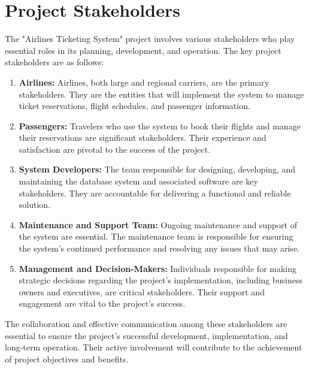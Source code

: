 \section{Project Stakeholders}
The "Airlines Ticketing System" project involves various stakeholders who play essential roles in its planning, development, and operation. The key project stakeholders are as follows:

\begin{enumerate}
    \item \textbf{Airlines:} Airlines, both large and regional carriers, are the primary stakeholders. They are the entities that will implement the system to manage ticket reservations, flight schedules, and passenger information.

    \item \textbf{Passengers:} Travelers who use the system to book their flights and manage their reservations are significant stakeholders. Their experience and satisfaction are pivotal to the success of the project.

    \item \textbf{System Developers:} The team responsible for designing, developing, and maintaining the database system and associated software are key stakeholders. They are accountable for delivering a functional and reliable solution.

    \item \textbf{Maintenance and Support Team:} Ongoing maintenance and support of the system are essential. The maintenance team is responsible for ensuring the system's continued performance and resolving any issues that may arise.

    \item \textbf{Management and Decision-Makers:} Individuals responsible for making strategic decisions regarding the project's implementation, including business owners and executives, are critical stakeholders. Their support and engagement are vital to the project's success.

\end{enumerate}

The collaboration and effective communication among these stakeholders are essential to ensure the project's successful development, implementation, and long-term operation. Their active involvement will contribute to the achievement of project objectives and benefits.


\clearpage